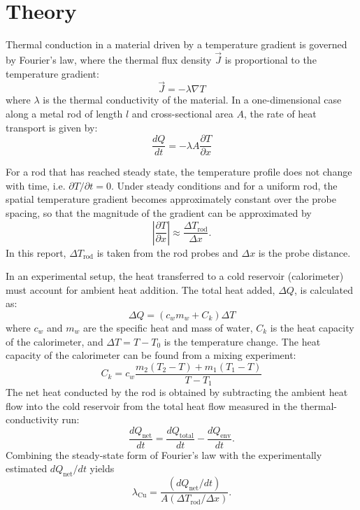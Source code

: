 \documentclass[journal]{IEEEtran}
\begin{document}
\section{Theory}
Thermal conduction in a material driven by a temperature gradient is governed by Fourier's law, where the thermal flux density $\vec{J}$ is proportional to the temperature gradient:
\begin{equation}
    \vec{J} = -\lambda \nabla T
\end{equation}
where $\lambda$ is the thermal conductivity of the material. In a one-dimensional case along a metal rod of length $l$ and cross-sectional area $A$, the rate of heat transport is given by:
\begin{equation}
    \frac{dQ}{dt} = -\lambda A \frac{\partial T}{\partial x}
\label{eq:heat_transport}
\end{equation}

For a rod that has reached steady state, the temperature profile does not change with
time, i.e. $\partial T/\partial t = 0$. Under steady conditions and for a uniform rod,
the spatial temperature gradient becomes approximately constant over the probe spacing,
so that the magnitude of the gradient can be approximated by
\begin{equation}
    \left|\frac{\partial T}{\partial x}\right| \approx \frac{\Delta T_{\text{rod}}}{\Delta x}.
\end{equation}
In this report, $\Delta T_{\text{rod}}$ is taken from the rod probes and $\Delta x$ is the
probe distance.

In an experimental setup, the heat transferred to a cold reservoir (calorimeter) must account for ambient heat addition. The total heat added, $\Delta Q$, is calculated as:
\begin{equation}
    \Delta Q = (c_w m_w + C_k) \Delta T
\end{equation}
where $c_w$ and $m_w$ are the specific heat and mass of water, $C_k$ is the heat capacity of the calorimeter, and $\Delta T = T - T_0$ is the temperature change. The heat capacity of the calorimeter can be found from a mixing experiment:
\begin{equation}
    C_k = c_w \frac{m_2(T_2 - T) + m_1(T_1 - T)}{T - T_1}
\end{equation}
The net heat conducted by the rod is obtained by subtracting the ambient heat flow into the
cold reservoir from the total heat flow measured in the thermal-conductivity run:
\begin{equation}
    \frac{dQ_{\text{net}}}{dt} = \frac{dQ_{\text{total}}}{dt} - \frac{dQ_{\text{env}}}{dt}.
\end{equation}
Combining the steady-state form of Fourier's law with the experimentally estimated
$dQ_{\text{net}}/dt$ yields
\begin{equation}
    \lambda_{\text{Cu}} = \frac{\left(dQ_{\text{net}}/dt\right)}{A\left(\Delta T_{\text{rod}}/\Delta x\right)}.
\end{equation}
\end{document}
